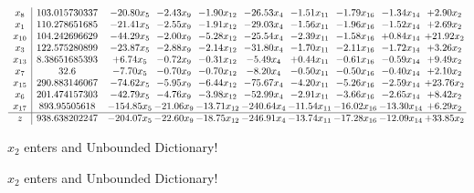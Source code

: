 \documentclass[9pt]{article}
\begin{document}
 \[\begin{array}{c| c c@{\hskip 2pt} c@{\hskip 2pt} c@{\hskip 2pt} c@{\hskip 2pt} c@{\hskip 2pt} c@{\hskip 2pt} c@{\hskip 2pt} c@{\hskip 2pt} }
 x_{8}   &  103.015730337 & -20.80 x_{5} & -2.43 x_{9} & -1.90 x_{12} & -26.53 x_{4} & -1.51 x_{11} & -1.79 x_{16} & -1.34 x_{14} & +  2.90 x_{2}\\
 x_{1}   &  110.278651685 & -21.41 x_{5} & -2.55 x_{9} & -1.91 x_{12} & -29.03 x_{4} & -1.56 x_{11} & -1.96 x_{16} & -1.52 x_{14} & +  2.69 x_{2}\\
 x_{10}   &  104.242696629 & -44.29 x_{5} & -2.00 x_{9} & -5.28 x_{12} & -25.54 x_{4} & -2.39 x_{11} & -1.58 x_{16} & +  0.84 x_{14} & + 21.92 x_{2}\\
 x_{3}   &  122.575280899 & -23.87 x_{5} & -2.88 x_{9} & -2.14 x_{12} & -31.80 x_{4} & -1.70 x_{11} & -2.11 x_{16} & -1.72 x_{14} & +  3.26 x_{2}\\
 x_{13}   &  8.38651685393 & +  6.74 x_{5} & -0.72 x_{9} & -0.31 x_{12} & -5.49 x_{4} & +  0.44 x_{11} & -0.61 x_{16} & -0.59 x_{14} & +  9.49 x_{2}\\
 x_{7}   &  32.6 & -7.70 x_{5} & -0.70 x_{9} & -0.70 x_{12} & -8.20 x_{4} & -0.50 x_{11} & -0.50 x_{16} & -0.40 x_{14} & +  2.10 x_{2}\\
 x_{15}   &  290.883146067 & -74.62 x_{5} & -5.95 x_{9} & -6.44 x_{12} & -75.67 x_{4} & -4.20 x_{11} & -5.26 x_{16} & -2.59 x_{14} & + 23.76 x_{2}\\
 x_{6}   &  201.474157303 & -42.79 x_{5} & -4.76 x_{9} & -3.98 x_{12} & -52.99 x_{4} & -2.91 x_{11} & -3.66 x_{16} & -2.65 x_{14} & +  8.42 x_{2}\\
 x_{17}   &  893.95505618 & -154.85 x_{5} & -21.06 x_{9} & -13.71 x_{12} & -240.64 x_{4} & -11.54 x_{11} & -16.02 x_{16} & -13.30 x_{14} & +  6.29 x_{2}\\
\hline
z    &  938.638202247 & -204.07 x_{5} & -22.60 x_{9} & -18.75 x_{12} & -246.91 x_{4} & -13.74 x_{11} & -17.28 x_{16} & -12.09 x_{14} & + 33.85 x_{2}\\
\end{array}\]


 $ x_{2} $ enters and Unbounded Dictionary!


 $ x_{2} $ enters and Unbounded Dictionary!
\end{document}
